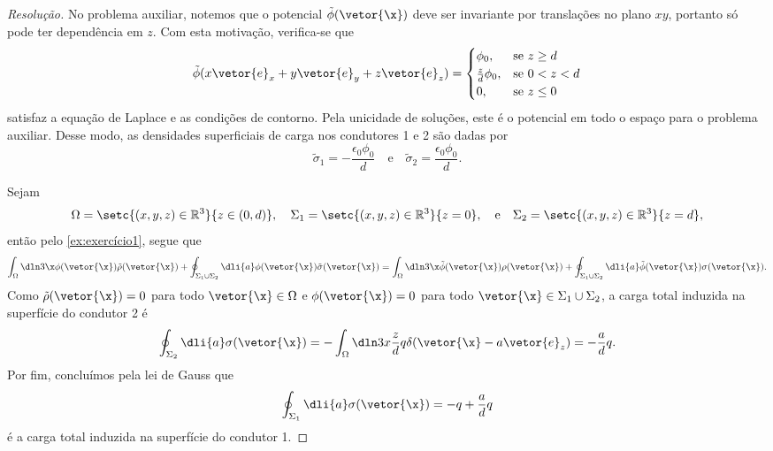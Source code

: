 \begin{proof}[Resolução]
    No problema auxiliar, notemos que o potencial \(\tilde{\phi}(\vetor{\x})\) deve ser invariante por translações no plano \(xy\), portanto só pode ter dependência em \(z\). Com esta motivação, verifica-se que
    \begin{equation*}
        \tilde{\phi}(x \vetor{e}_x + y\vetor{e}_y + z\vetor{e}_z) = \begin{cases}
            \phi_0,&\text{se }z \geq d\\
            \frac{z}{d}\phi_0,&\text{se }0 < z < d\\
            0,&\text{se }z\leq 0
        \end{cases}
    \end{equation*}
    satisfaz a equação de Laplace e as condições de contorno. Pela unicidade de soluções, este é o potencial em todo o espaço para o problema auxiliar. Desse modo, as densidades superficiais de carga nos condutores 1 e 2 são dadas por
    \begin{equation*}
        \tilde{\sigma}_1 = -\frac{\epsilon_0 \phi_0}{d}
        \quad\text{e}\quad
        \tilde{\sigma}_2 = \frac{\epsilon_0 \phi_0}{d}.
    \end{equation*}

    Sejam
    \begin{equation*}
        \Omega = \setc{(x,y,z) \in \mathbb{R}^3}{z \in (0, d)},
        \quad
        \Sigma_1 = \setc{(x,y,z) \in \mathbb{R}^3}{z = 0},
        \quad\text{e}\quad
        \Sigma_2 = \setc{(x,y,z) \in \mathbb{R}^3}{z = d},
    \end{equation*}
    então pelo \cref{ex:exercício1}, segue que
    \begin{equation*}
        \int_{\Omega}\dln3\x \phi(\vetor{\x}) \tilde{\rho}(\vetor{\x}) + \oint_{\Sigma_1 \cup \Sigma_2}\dli{a} \phi(\vetor{\x})\tilde{\sigma}(\vetor{\x}) = \int_{\Omega}\dln3\x \tilde{\phi}(\vetor{\x})\rho(\vetor{\x}) + \oint_{\Sigma_1 \cup \Sigma_2} \dli{a} \tilde{\phi}(\vetor{\x})\sigma(\vetor{\x}).
    \end{equation*}
    Como \(\tilde{\rho}(\vetor{\x}) = 0\) para todo \(\vetor{\x} \in \Omega\) e \(\phi(\vetor{\x}) = 0\) para todo \(\vetor{\x} \in \Sigma_1 \cup \Sigma_2\), a carga total induzida na superfície do condutor 2 é
    \begin{equation*}
        \oint_{\Sigma_2} \dli{a} \sigma(\vetor{\x}) = -\int_{\Omega}\dln3x \frac{z}{d} q \delta(\vetor{\x} - a\vetor{e}_z) = -\frac{a}{d}q.
    \end{equation*}
    Por fim, concluímos pela lei de Gauss que
    \begin{equation*}
        \oint_{\Sigma_1} \dli{a} \sigma(\vetor{\x}) = -q + \frac{a}{d}q
    \end{equation*}
    é a carga total induzida na superfície do condutor 1.
\end{proof}
